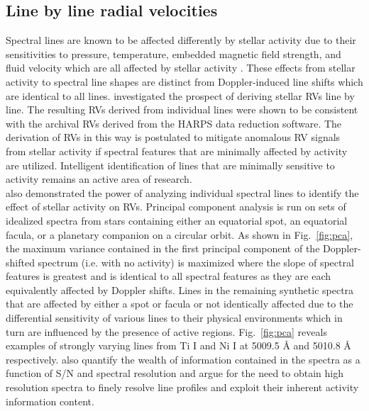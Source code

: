 

\subsection{Line by line radial velocities}
Spectral lines are known to be affected differently by stellar activity due to their
sensitivities to pressure, temperature, embedded magnetic field strength, and fluid
velocity which are all affected by stellar activity \citep{davis17,wise18}. These
effects from stellar activity to spectral line shapes are distinct from Doppler-induced
line shifts which are identical to all lines. \cite{dumusque18} investigated
the prospect of deriving stellar RVs line by line. The resulting RVs derived from
individual lines were shown to be
consistent with the archival RVs derived from the HARPS data reduction software.
The derivation of RVs in this way is postulated to mitigate anomalous RV signals
from stellar activity if spectral features that are minimally affected by activity
are utilized. Intelligent identification of lines that are minimally sensitive to
activity remains an active area of research. \\

\cite{davis17} also demonstrated the power of analyzing individual spectral lines
to identify the effect of stellar activity on RVs. Principal component analysis
is run on sets of idealized spectra from stars containing either an equatorial spot,
an equatorial facula, or a planetary companion on a circular orbit. As shown in
Fig.~\ref{fig:pca}, the maximum variance contained in the first principal component
of the Doppler-shifted spectrum (i.e. with no activity) is maximized where the slope
of spectral features is greatest and is identical to all spectral features as they
are each equivalently affected by Doppler shifts. Lines in the remaining synthetic
spectra that are affected by either a spot or facula or not identically affected due
to the differential sensitivity of various lines to their physical environments
which in turn are influenced by the presence of active regions. Fig.~\ref{fig:pca}
reveals examples of strongly varying lines from Ti \footnotesize I \normalsize and Ni
\footnotesize I \normalsize at 5009.5 \AA{} and 5010.8 \AA{} respectively.
\cite{davis17} also quantify the wealth of information contained in the spectra
as a function of S/N and spectral resolution and argue for the need to obtain
high resolution spectra to finely resolve line profiles and exploit their inherent
activity information content.

